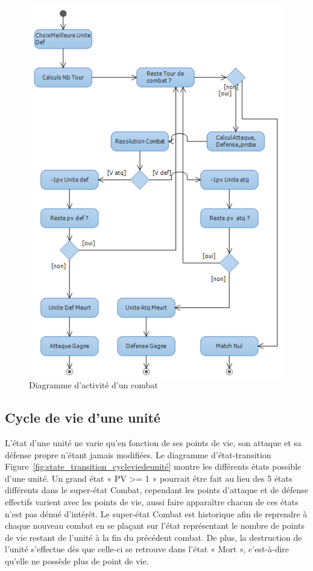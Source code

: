 \documentclass[a4paper]{article}%
\begin{document}
\begin{figure}[H]
    \centering
    \includegraphics[width=\textwidth]{./images/activity/DiagActivityCombat1.png}
                \caption{Diagramme d'activité d'un combat}
                \label{fig:activity_déroulementcombat}
\end{figure}

\newpage

\subsection{Cycle de vie d'une unité}
L'état d'une unité ne varie qu'en fonction de ses points de vie, son attaque et sa défense propre n'étant jamais modifiées. Le diagramme d'état-transition Figure~\ref{fig:state_transition_cycleviedeunité} montre les différents états possible d'une unité. Un grand état « PV >= 1 » pourrait être fait au lieu des 5 états différents dans le super-état Combat, cependant les points d'attaque et de défense effectifs varient avec les points de vie, aussi faire apparaître chacun de ces états n'est pas dénué d'intérêt.
Le super-état Combat est historique afin de reprendre à chaque nouveau combat en se plaçant sur l'état représentant le nombre de points de vie restant de l'unité à la fin du précédent combat. De plus, la destruction de l'unité s'effectue dès que celle-ci se retrouve dans l'état « Mort », c'est-à-dire qu'elle ne possède plus de point de vie.
\end{document}
